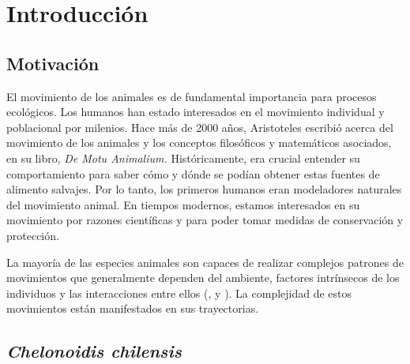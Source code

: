 \chapter{Introducción}
 
\section{Motivación}
El movimiento de los animales es de fundamental importancia para procesos ecológicos. Los humanos han estado interesados en el movimiento individual y poblacional por milenios. Hace más de 2000 años, Aristoteles escribió acerca del movimiento de los animales y los conceptos filosóficos y matemáticos asociados, en su libro, \textit{De Motu Animalium.} Históricamente, era crucial entender su comportamiento para saber cómo y dónde se podían obtener estas fuentes de alimento salvajes. Por lo tanto, los primeros humanos eran modeladores naturales del movimiento animal.  En tiempos modernos, estamos interesados en su movimiento por razones científicas y para poder tomar medidas de conservación y protección.
 
 
 
La mayoría de las especies animales son capaces de realizar complejos patrones de movimientos que generalmente dependen del ambiente, factores intrínsecos de los individuos y las interacciones entre ellos (\cite{morales2005adaptive}, \cite{morales2010building} y \cite{nathan2008emerging}). La complejidad de estos movimientos están manifestados en sus trayectorias. %
 
 
 
\section{  \textit{Chelonoidis chilensis} }
\label{C chilensis}
 

